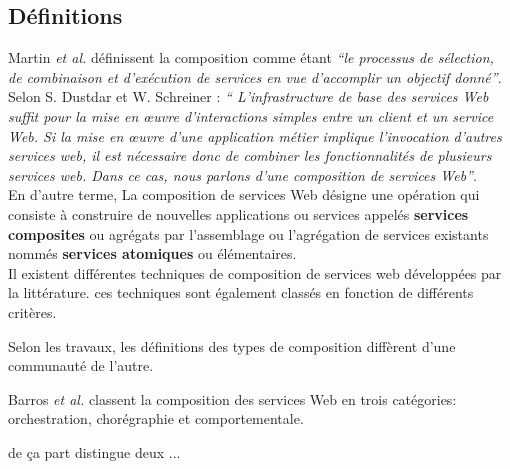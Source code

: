     \subsection{Définitions}
    \label{sec:definitions}

    Martin \emph{et al.} \cite{martin2004owl} définissent
    la composition comme étant \emph{``le processus de sélection, de
      combinaison et d'exécution de services en vue
      d'accomplir un objectif donné''}.\\
  
    Selon S. Dustdar et W. Schreiner \cite{dustdar2005survey} :
    \emph{`` L'infrastructure de base des services Web suffit pour la
      mise en œuvre d'interactions simples entre un client et un
      service Web. Si la mise en œuvre d'une application métier
      implique l'invocation d'autres services web, il est nécessaire
      donc de combiner les fonctionnalités de plusieurs services
      web. Dans ce cas, nous parlons d'une composition de services
      Web''}.\\
    
    En d'autre terme, La composition de services Web désigne une
    opération qui consiste à construire de nouvelles applications ou
    services appelés \textbf{services composites} ou agrégats par
    l'assemblage ou l'agrégation de services existants nommés
    \textbf{services atomiques} ou
    élémentaires.\\

    Il existent différentes techniques de composition de services web
    développées par la littérature. ces techniques sont également
    classés en fonction de différents critères.

    Selon les travaux, les définitions des types de composition
    diffèrent d'une communauté de l'autre.

    Barros \emph{et al.} \cite{barros2006standards} classent la
    composition des services Web en trois catégories: orchestration,
    chorégraphie et comportementale.

    \cite{peltz2003web} de ça part distingue deux ...



